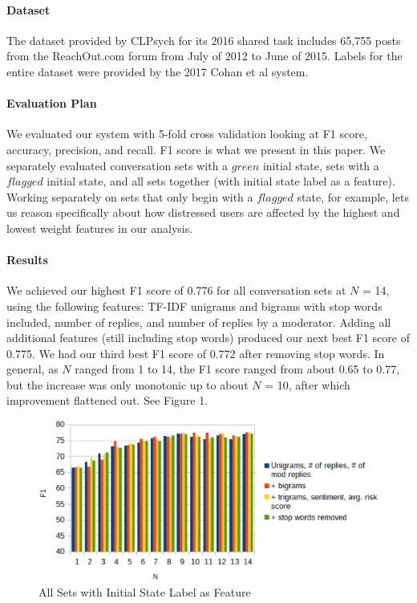 \documentclass{article}
\begin{document}
\paragraph{Dataset}The dataset provided by CLPsych for its 2016 shared task includes 65,755 posts from the ReachOut.com forum from July of 2012 to June of 2015. Labels for the entire dataset were provided by the 2017 Cohan et al system.

\paragraph{Evaluation Plan}We evaluated our system with 5-fold cross validation looking at F1 score, accuracy, precision, and recall. F1 score is what we present in this paper. We separately evaluated conversation sets with a $green$ initial state, sets with a $flagged$ initial state, and all sets together (with initial state label as a feature). Working separately on sets that only begin with a $flagged$ state, for example, lets us reason specifically about how distressed users are affected by the highest and lowest weight features in our analysis.

\paragraph{Results}We achieved our highest F1 score of 0.776 for all conversation sets at $N$ = 14, using the following features: TF-IDF unigrams and bigrams with stop words included, number of replies, and number of replies by a moderator. Adding all additional features (still including stop words) produced our next best F1 score of 0.775. We had our third best F1 score of 0.772 after removing stop words. In general, as $N$ ranged from 1 to 14, the F1 score ranged from about 0.65 to 0.77, but the increase was only monotonic up to about $N$ = 10, after which improvement flattened out. See Figure 1.

\begin{figure}[h!]
    \includegraphics[width=14cm]{resultsAll}
    \caption{All Sets with Initial State Label as Feature}
\end{figure}
\end{document}
